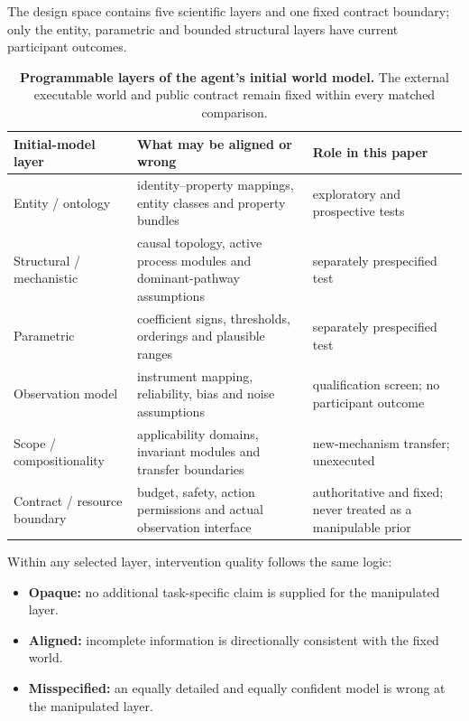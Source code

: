 \documentclass[10pt,twocolumn]{article}
\providecommand{\tightlist}{%
  \setlength{\itemsep}{0pt}\setlength{\parskip}{0pt}}
\begin{document}
The design space contains five scientific layers and one fixed contract
boundary; only the entity, parametric and bounded structural layers have
current participant outcomes.

\begin{table}[!t]
\centering
\caption{\textbf{Programmable layers of the agent's initial world model.} The external executable world and public contract remain fixed within every matched comparison.}
\label{tab:initial-world-model-layers}
\scriptsize
\begin{tabularx}{\textwidth}{L{0.18\textwidth}Y L{0.29\textwidth}}
\toprule
Initial-model layer & What may be aligned or wrong & Role in this paper \\
\midrule
Entity / ontology & identity--property mappings, entity classes and property bundles & exploratory and prospective tests \\
Structural / mechanistic & causal topology, active process modules and dominant-pathway assumptions & separately prespecified test \\
Parametric & coefficient signs, thresholds, orderings and plausible ranges & separately prespecified test \\
Observation model & instrument mapping, reliability, bias and noise assumptions & qualification screen; no participant outcome \\
Scope / compositionality & applicability domains, invariant modules and transfer boundaries & new-mechanism transfer; unexecuted \\
Contract / resource boundary & budget, safety, action permissions and actual observation interface & authoritative and fixed; never treated as a manipulable prior \\
\bottomrule
\end{tabularx}
\end{table}

Within any selected layer, intervention quality follows the same logic:

\begin{itemize}
\tightlist
\item
  \textbf{Opaque:} no additional task-specific claim is supplied for the
  manipulated layer.
\item
  \textbf{Aligned:} incomplete information is directionally consistent
  with the fixed world.
\item
  \textbf{Misspecified:} an equally detailed and equally confident model
  is wrong at the manipulated layer.
\end{itemize}
\end{document}
